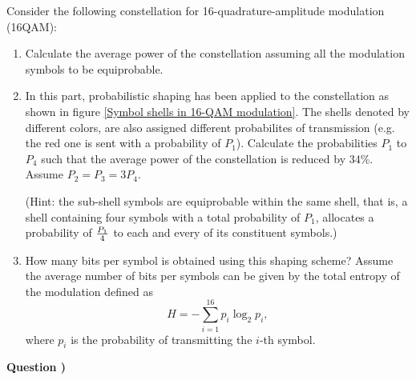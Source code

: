 \documentclass[10pt,letterpaper]{article}
\newcounter{QuestionNumber}
\newcommand{\Q}{
\textbf{Question \theQuestionNumber)}
\stepcounter{QuestionNumber}
}
\begin{document}
Consider the following constellation for 16-quadrature-amplitude modulation (16QAM):
\begin{enumerate}[label=\alph*-]
\item
Calculate the average power of the constellation assuming all the modulation symbols to be equiprobable.
\item
In this part, probabilistic shaping has been applied to the constellation as shown in figure \ref{Symbol shells in 16-QAM modulation}. The shells denoted by different colors, are also assigned different probabilites of transmission (e.g. the red one is sent with a probability of $P_1$). Calculate the probabilities $P_1$ to $P_4$ such that the average power of the constellation is reduced by 34\%. Assume $P_2=P_3=3P_4$.

(Hint: the sub-shell symbols are equiprobable within the same shell, that is, a shell containing four symbols with a total probability of $P_1$, allocates a probability of $P_1\over 4$ to each and every of its constituent symbols.)
\item
How many bits per symbol is obtained using this shaping scheme? Assume the average number of bits per symbols can be given by the total entropy of the modulation defined as
$$
H=-\sum_{i=1}^{16} p_i\log_2 p_i,
$$
where $p_i$ is the probability of transmitting the $i$-th symbol.
\end{enumerate}
\Q
\end{document}

